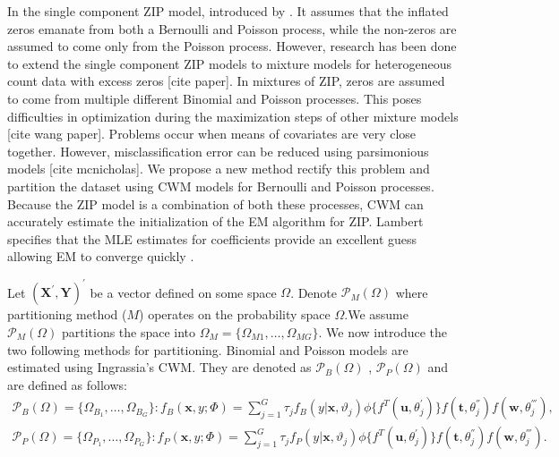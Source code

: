 \documentclass[11pt,letterpaper]{article}
\numberwithin{equation}{section}
\numberwithin{equation}{section}
\numberwithin{equation}{section}
\begin{document}
In the single component ZIP model, introduced by \cite{Lambert}. It assumes that the inflated zeros emanate from both a Bernoulli and Poisson process, while the non-zeros are assumed to come only from the Poisson process. However, research has been done to extend the single component ZIP models to mixture models for heterogeneous count data with excess zeros [cite paper]. %
In mixtures of ZIP, zeros are assumed to come from multiple different Binomial and Poisson processes. This poses difficulties in optimization during the maximization steps of other mixture models [cite wang paper]. %
Problems occur when means of covariates are very close together. However, misclassification error can be reduced using parsimonious models [cite mcnicholas]. %
We propose a new method rectify this problem and partition the dataset using CWM models for Bernoulli and Poisson processes. Because the ZIP model is a combination of both these processes, CWM can accurately estimate the initialization of the EM algorithm for ZIP. Lambert specifies that the MLE estimates for coefficients provide an excellent guess allowing EM to converge quickly \citep{Lambert}. 

Let $(\bm {X^{'}}, \bm{Y})^{'}$ be a vector defined on some space $\Omega$. Denote $\mathcal{P}_{M}(\Omega) $ where partitioning method ($M$) operates on the probability space $\Omega$.We assume  $\mathcal{P}_M(\Omega) $ partitions the space into $ \Omega_M = \{  \Omega_{M1}, \ldots, \Omega_{MG} \}$.
We now introduce the two following methods for partitioning. Binomial and Poisson models are estimated using Ingrassia's CWM. %
They are denoted as $\mathcal{P}_B (\Omega) $ ,  $\mathcal{P}_P (\Omega) $  and are defined as follows:
\begin{align*}
\mathcal{P}_B (\Omega) = \{  \Omega_{B_1}, \ldots, \Omega_{B_G} \}:
f_B(\bm x, y; \Phi)= \sum_{j=1}^{G} \tau_j f_B(y|\bm{x},\vartheta_j)\phi\{f^{T}(\bm{u},\theta_j^{'})\}f(\bm{t},\theta_j^{''})f(\bm{w},\theta_j^{'''}),\\
\mathcal{P}_P (\Omega) = \{  \Omega_{P_1}, \ldots, \Omega_{P_G} \}:
f_P(\bm x, y; \Phi)= \sum_{j=1}^{G} \tau_j f_P(y|\bm{x},\vartheta_j)\phi\{f^{T}(\bm{u},\theta_j^{'})\}f(\bm{t},\theta_j^{''})f(\bm{w},\theta_j^{'''}).  
\end{align*}
\end{document}
